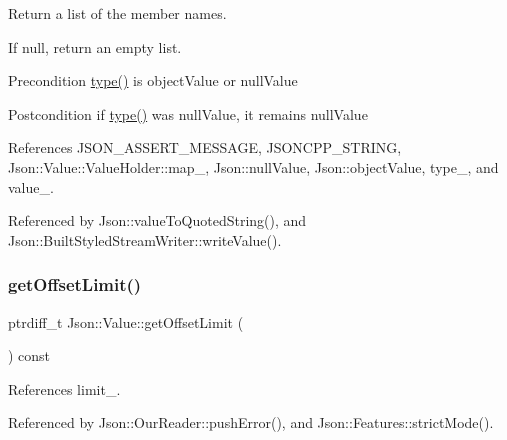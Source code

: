 Return a list of the member names. 

If null, return an empty list. \begin{DoxyPrecond}{Precondition}
\hyperlink{classJson_1_1Value_a8ce61157a011894f0252ceed232312de_a8ce61157a011894f0252ceed232312de}{type()} is object\+Value or null\+Value 
\end{DoxyPrecond}
\begin{DoxyPostcond}{Postcondition}
if \hyperlink{classJson_1_1Value_a8ce61157a011894f0252ceed232312de_a8ce61157a011894f0252ceed232312de}{type()} was null\+Value, it remains null\+Value 
\end{DoxyPostcond}


References J\+S\+O\+N\+\_\+\+A\+S\+S\+E\+R\+T\+\_\+\+M\+E\+S\+S\+A\+GE, J\+S\+O\+N\+C\+P\+P\+\_\+\+S\+T\+R\+I\+NG, Json\+::\+Value\+::\+Value\+Holder\+::map\+\_\+, Json\+::null\+Value, Json\+::object\+Value, type\+\_\+, and value\+\_\+.



Referenced by Json\+::value\+To\+Quoted\+String(), and Json\+::\+Built\+Styled\+Stream\+Writer\+::write\+Value().

\mbox{\label{classJson_1_1Value_a2cdfa01935f87fcace90d450cbd2c0a4_a2cdfa01935f87fcace90d450cbd2c0a4}} 
\subsubsection{\texorpdfstring{get\+Offset\+Limit()}{getOffsetLimit()}}
{\footnotesize\ttfamily ptrdiff\+\_\+t Json\+::\+Value\+::get\+Offset\+Limit (\begin{DoxyParamCaption}{ }\end{DoxyParamCaption}) const}



References limit\+\_\+.



Referenced by Json\+::\+Our\+Reader\+::push\+Error(), and Json\+::\+Features\+::strict\+Mode().

\mbox{\label{classJson_1_1Value_afa081dc764000951a1d8d6148155508e_afa081dc764000951a1d8d6148155508e}} 
